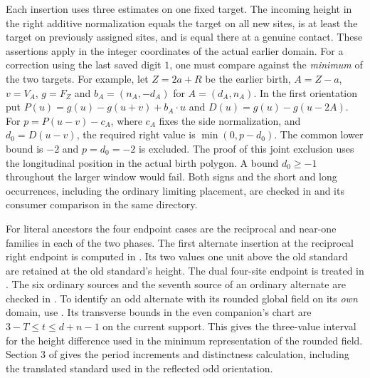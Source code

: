\documentclass[11pt]{article}
\begin{document}
Each insertion uses three estimates on one fixed target. The incoming height in the right additive normalization equals the target on all new sites, is at least the target on previously assigned sites, and is equal there at a genuine contact. These assertions apply in the integer coordinates of the actual earlier domain. For a correction using the last saved digit $1$, one must compare against the \emph{minimum} of the two targets. For example, let $Z=2a+R$ be the earlier birth, $A=Z-a$, $v=V_A$, $g=F_Z$ and $b_A=(n_A,-d_A)$ for $A=(d_A,n_A)$. In the first orientation put $P(u)=g(u)-g(u+v)+b_A\cdot u$ and $D(u)=g(u)-g(u-2A)$. For $p=P(u-v)-c_A$, where $c_A$ fixes the side normalization, and $d_0=D(u-v)$, the required right value is $\min(0,p-d_0)$. The common lower bound is $-2$ and $p=d_0=-2$ is excluded. The proof of this joint exclusion uses the longitudinal position in the actual birth polygon. A bound $d_0\ge-1$ throughout the larger window would fail. Both signs and the short and long occurrences, including the ordinary limiting placement, are checked in  and its consumer comparison in the same directory.

For literal ancestors the four endpoint cases are the reciprocal and near-one families in each of the two phases. The first alternate insertion at the reciprocal right endpoint is computed in . Its two values one unit above the old standard are retained at the old standard's height. The dual four-site endpoint is treated in . The six ordinary sources and the seventh source of an ordinary alternate are checked in . To identify an odd alternate with its rounded global field on its \emph{own} domain, use . Its transverse bounds in the even companion's chart are $3-T\le t\le d+n-1$ on the current support. This gives the three-value interval for the height difference used in the minimum representation of the rounded field. Section 3 of  gives the period increments and distinctness calculation, including the translated standard used in the reflected odd orientation.
\end{document}
